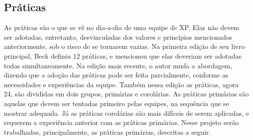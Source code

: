 \documentclass[a4paper,12pt,font=plain,header=plain]{abnt}
\begin{document}
    \subsection{Práticas}
      As práticas são o que se vê no dia-a-dia de uma equipe de XP. Elas não devem ser adotadas, entretanto, desvinculadas dos valores e princípios mencionados anteriormente, sob o risco de se tornarem vazias. Na primeira edição de seu livro principal, Beck definiu 12 práticas, e mencionou que elas deveriam ser adotadas todas simultaneamente. Na edição mais recente, o autor muda a abordagem, dizendo que a adoção das práticas pode ser feita parcialmente, conforme as necessidades e experiências da equipe. Também nessa edição as práticas, agora 24, são divididas em dois grupos, primárias e corolárias. As práticas primárias são aquelas que devem ser tentadas primeiro pelas equipes, na sequência que se mostrar adequada. Já as práticas corolárias são mais difíceis de serem aplicadas, e requerem a experiência anterior com as práticas primárias. Nesse projeto serão trabalhadas, principalmente, as práticas primárias, descritas a seguir.
\end{document}
